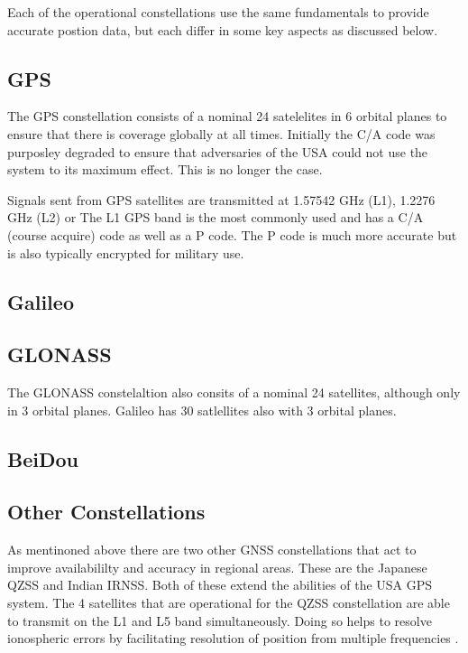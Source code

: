 Each of the operational constellations use the same fundamentals to provide accurate postion data, but each differ in some key aspects as discussed below.

\subsection{GPS} \label{subsec:GNSS_GPSIntro}
The GPS constellation consists of a nominal 24 satelelites in 6 orbital planes to ensure that there is coverage globally at all times. Initially the C/A code was
purposley degraded to ensure that adversaries of the USA could not use the system to its maximum effect. This is no longer the case. 

Signals sent from GPS satellites
are transmitted at 1.57542 GHz (L1), 1.2276 GHz (L2) or  
The L1 GPS band is the most commonly used and has a C/A (course acquire) code as well as a P code. The P code is much more accurate but is also typically encrypted for
military use.

\subsection{Galileo} \label{subsec:GNSS_GalileoIntro}

\subsection{GLONASS} \label{subsec:GNSS_GLONASSIntro}
The GLONASS constelaltion also consits of a nominal 24 satellites, although only in 3 orbital planes. Galileo has 30 satlellites also with 3 orbital planes.

\subsection{BeiDou} \label{subsec:GNSS_BeiDouIntro}

\subsection{Other Constellations} \label{subsec:GNSS_OtherIntro}
As mentinoned above there are two other GNSS constellations that act to improve availabililty and accuracy in regional areas. These are the Japanese QZSS and Indian
IRNSS. Both of these extend the abilities of the USA GPS system. The 4 satellites that are operational for the QZSS constellation are able to transmit on the L1 and L5
band  simultaneously. Doing so helps to resolve ionospheric errors by facilitating resolution of position from multiple frequencies \cite{RN48}.

